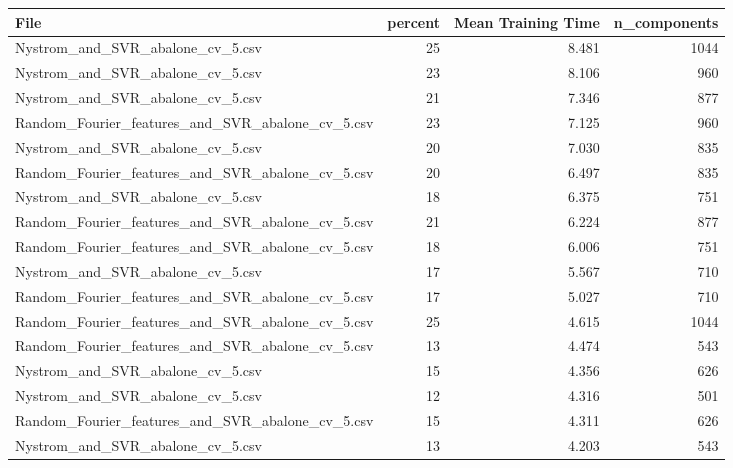 \begin{tabularx}{\textwidth}{lrrr}
\toprule
                                            File &  percent &  Mean Training Time &  n\_components \\
\midrule
                Nystrom\_and\_SVR\_abalone\_cv\_5.csv &       25 &               8.481 &          1044 \\
                Nystrom\_and\_SVR\_abalone\_cv\_5.csv &       23 &               8.106 &           960 \\
                Nystrom\_and\_SVR\_abalone\_cv\_5.csv &       21 &               7.346 &           877 \\
Random\_Fourier\_features\_and\_SVR\_abalone\_cv\_5.csv &       23 &               7.125 &           960 \\
                Nystrom\_and\_SVR\_abalone\_cv\_5.csv &       20 &               7.030 &           835 \\
Random\_Fourier\_features\_and\_SVR\_abalone\_cv\_5.csv &       20 &               6.497 &           835 \\
                Nystrom\_and\_SVR\_abalone\_cv\_5.csv &       18 &               6.375 &           751 \\
Random\_Fourier\_features\_and\_SVR\_abalone\_cv\_5.csv &       21 &               6.224 &           877 \\
Random\_Fourier\_features\_and\_SVR\_abalone\_cv\_5.csv &       18 &               6.006 &           751 \\
                Nystrom\_and\_SVR\_abalone\_cv\_5.csv &       17 &               5.567 &           710 \\
Random\_Fourier\_features\_and\_SVR\_abalone\_cv\_5.csv &       17 &               5.027 &           710 \\
Random\_Fourier\_features\_and\_SVR\_abalone\_cv\_5.csv &       25 &               4.615 &          1044 \\
Random\_Fourier\_features\_and\_SVR\_abalone\_cv\_5.csv &       13 &               4.474 &           543 \\
                Nystrom\_and\_SVR\_abalone\_cv\_5.csv &       15 &               4.356 &           626 \\
                Nystrom\_and\_SVR\_abalone\_cv\_5.csv &       12 &               4.316 &           501 \\
Random\_Fourier\_features\_and\_SVR\_abalone\_cv\_5.csv &       15 &               4.311 &           626 \\
                Nystrom\_and\_SVR\_abalone\_cv\_5.csv &       13 &               4.203 &           543 \\

\end{tabularx}
